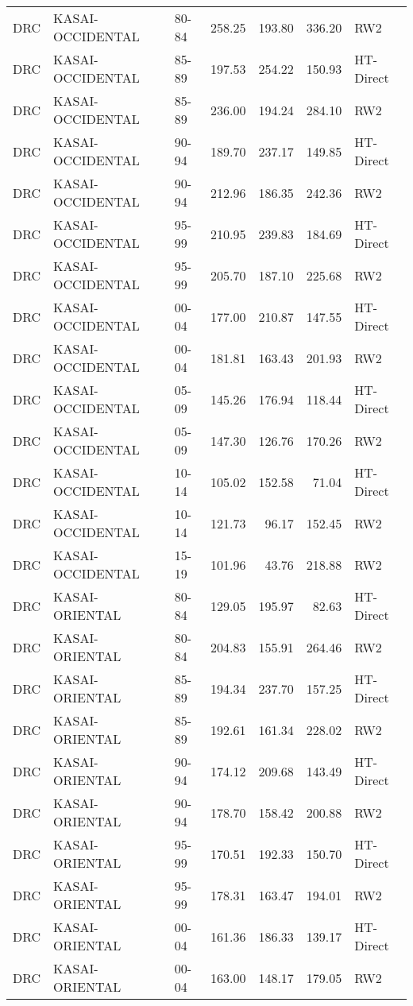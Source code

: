 \begin{longtable}{lllrrrl}
  DRC & KASAI-OCCIDENTAL & 80-84 & 258.25 & 193.80 & 336.20 & RW2 \\ 
  DRC & KASAI-OCCIDENTAL & 85-89 & 197.53 & 254.22 & 150.93 & HT-Direct \\ 
  DRC & KASAI-OCCIDENTAL & 85-89 & 236.00 & 194.24 & 284.10 & RW2 \\ 
  DRC & KASAI-OCCIDENTAL & 90-94 & 189.70 & 237.17 & 149.85 & HT-Direct \\ 
  DRC & KASAI-OCCIDENTAL & 90-94 & 212.96 & 186.35 & 242.36 & RW2 \\ 
  DRC & KASAI-OCCIDENTAL & 95-99 & 210.95 & 239.83 & 184.69 & HT-Direct \\ 
  DRC & KASAI-OCCIDENTAL & 95-99 & 205.70 & 187.10 & 225.68 & RW2 \\ 
  DRC & KASAI-OCCIDENTAL & 00-04 & 177.00 & 210.87 & 147.55 & HT-Direct \\ 
  DRC & KASAI-OCCIDENTAL & 00-04 & 181.81 & 163.43 & 201.93 & RW2 \\ 
  DRC & KASAI-OCCIDENTAL & 05-09 & 145.26 & 176.94 & 118.44 & HT-Direct \\ 
  DRC & KASAI-OCCIDENTAL & 05-09 & 147.30 & 126.76 & 170.26 & RW2 \\ 
  DRC & KASAI-OCCIDENTAL & 10-14 & 105.02 & 152.58 & 71.04 & HT-Direct \\ 
  DRC & KASAI-OCCIDENTAL & 10-14 & 121.73 & 96.17 & 152.45 & RW2 \\ 
  DRC & KASAI-OCCIDENTAL & 15-19 & 101.96 & 43.76 & 218.88 & RW2 \\ 
  DRC & KASAI-ORIENTAL & 80-84 & 129.05 & 195.97 & 82.63 & HT-Direct \\ 
  DRC & KASAI-ORIENTAL & 80-84 & 204.83 & 155.91 & 264.46 & RW2 \\ 
  DRC & KASAI-ORIENTAL & 85-89 & 194.34 & 237.70 & 157.25 & HT-Direct \\ 
  DRC & KASAI-ORIENTAL & 85-89 & 192.61 & 161.34 & 228.02 & RW2 \\ 
  DRC & KASAI-ORIENTAL & 90-94 & 174.12 & 209.68 & 143.49 & HT-Direct \\ 
  DRC & KASAI-ORIENTAL & 90-94 & 178.70 & 158.42 & 200.88 & RW2 \\ 
  DRC & KASAI-ORIENTAL & 95-99 & 170.51 & 192.33 & 150.70 & HT-Direct \\ 
  DRC & KASAI-ORIENTAL & 95-99 & 178.31 & 163.47 & 194.01 & RW2 \\ 
  DRC & KASAI-ORIENTAL & 00-04 & 161.36 & 186.33 & 139.17 & HT-Direct \\ 
  DRC & KASAI-ORIENTAL & 00-04 & 163.00 & 148.17 & 179.05 & RW2 \\ 

\end{longtable}
